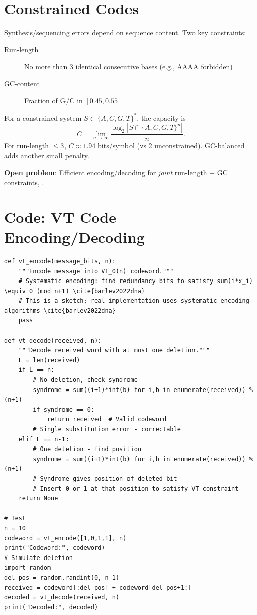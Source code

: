 \section{Constrained Codes}
\label{sec:dna:constrained}

Synthesis/sequencing errors depend on sequence content. Two key constraints:

\begin{description}
    \item[Run-length] No more than 3 identical consecutive bases (e.g., AAAA forbidden)
    \item[GC-content] Fraction of G/C in $[0.45, 0.55]$
\end{description}

\begin{theorem}
For a constrained system $S \subset \{A,C,G,T\}^*$, the capacity is
\[
C = \lim_{n\to\infty} \frac{\log_2 |S \cap \{A,C,G,T\}^n|}{n}.
\]
For run-length $\le 3$, $C \approx 1.94$ bits/symbol (vs 2 unconstrained). GC-balanced adds another small penalty.
\end{theorem}

\textbf{Open problem}: Efficient encoding/decoding for \emph{joint} run-length + GC constraints, \cite{barlev2022dna}.

\section{Code: VT Code Encoding/Decoding} \cite{barlev2022dna}
\label{sec:dna:code}

\begin{lstlisting}[style=python,caption=VT code single-deletion correction]
def vt_encode(message_bits, n):
    """Encode message into VT_0(n) codeword."""
    # Systematic encoding: find redundancy bits to satisfy sum(i*x_i) \equiv 0 (mod n+1) \cite{barlev2022dna}
    # This is a sketch; real implementation uses systematic encoding algorithms \cite{barlev2022dna}
    pass

def vt_decode(received, n):
    """Decode received word with at most one deletion."""
    L = len(received)
    if L == n:
        # No deletion, check syndrome
        syndrome = sum((i+1)*int(b) for i,b in enumerate(received)) % (n+1)
        if syndrome == 0:
            return received  # Valid codeword
        # Single substitution error - correctable
    elif L == n-1:
        # One deletion - find position
        syndrome = sum((i+1)*int(b) for i,b in enumerate(received)) % (n+1)
        # Syndrome gives position of deleted bit
        # Insert 0 or 1 at that position to satisfy VT constraint
    return None

# Test
n = 10
codeword = vt_encode([1,0,1,1], n)
print("Codeword:", codeword)
# Simulate deletion
import random
del_pos = random.randint(0, n-1)
received = codeword[:del_pos] + codeword[del_pos+1:]
decoded = vt_decode(received, n)
print("Decoded:", decoded)
\end{lstlisting}

